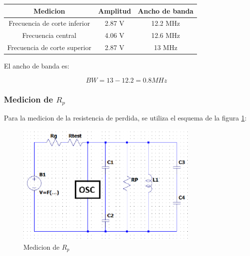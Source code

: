 \begin{table}[h]
    \centering
    \begin{tabular}{|c|c|c|}
    \hline
    \rowcolor[HTML]{C0C0C0} 
    \textbf{Medicion} & \textbf{Amplitud} & \textbf{Ancho de banda} \\ \hline
    Frecuencia de corte inferior            & 2.87 V             & 12.2 MHz                \\ \hline
    Frecuencia central         & 4.06 V             & 12.6 MHz                \\ \hline
    Frecuencia de corte superior            & 2.87 V             & 13 MHz                \\ \hline
    \end{tabular}
\end{table}

El ancho de banda es:

\begin{equation}
    BW = 13 - 12.2 = 0.8 MHz
\end{equation}

\subsubsection{Medicion de $R_p$}

Para la medicion de la resistencia de perdida, se utiliza el esquema de la figura \ref{fig: de la medicion de la resistencia de perdida}:

\begin{figure}[h]
    \centering
    \includegraphics[width=0.8\textwidth]{Imagenes/medicion_rp.png}
    \caption{Medicion de $R_p$}
    \label{fig: de la medicion de la resistencia de perdida}
\end{figure}

